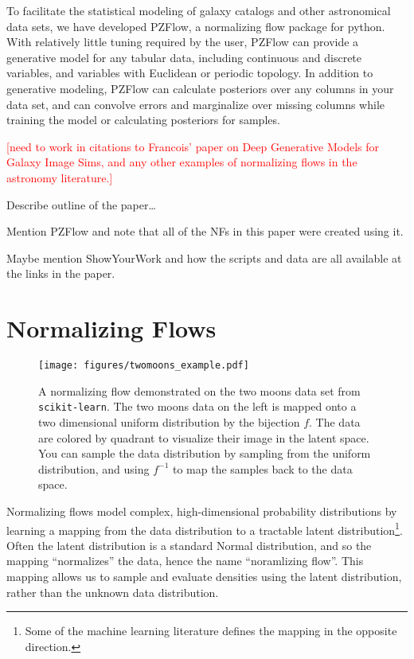 \documentclass[twocolumn]{aastex631}
\newcommand{\note}[1]{\textsf{\textcolor{red}{#1}}}
\begin{document}
To facilitate the statistical modeling of galaxy catalogs and other astronomical data sets, we have developed PZFlow, a normalizing flow package for python.
With relatively little tuning required by the user, PZFlow can provide a generative model for any tabular data, including continuous and discrete variables, and variables with Euclidean or periodic topology.
In addition to generative modeling, PZFlow can calculate posteriors over any columns in your data set, and can convolve errors and marginalize over missing columns while training the model or calculating posteriors for samples.

\note{[need to work in citations to Francois' paper on Deep Generative Models for Galaxy Image Sims, and any other examples of normalizing flows in the astronomy literature.]}

Describe outline of the paper\dots

Mention PZFlow and note that all of the NFs in this paper were created using it.

Maybe mention ShowYourWork and how the scripts and data are all available at the links in the paper.


\section{Normalizing Flows}
\label{sec:nf}

\begin{figure*}[t!]
    \begin{centering}
        \texttt{[image: figures/twomoons\_example.pdf]}
        \caption{
            A normalizing flow demonstrated on the two moons data set from \texttt{scikit-learn}.
            The two moons data on the left is mapped onto a two dimensional uniform distribution by the bijection $f$.
            The data are colored by quadrant to visualize their image in the latent space.
            You can sample the data distribution by sampling from the uniform distribution, and using $f^{-1}$ to map the samples back to the data space.
        }
        \label{fig:two-moons}
    \end{centering}
\end{figure*}

Normalizing flows model complex, high-dimensional probability distributions by learning a mapping from the data distribution to a tractable latent distribution\footnote{Some of the machine learning literature defines the mapping in the opposite direction.}.
Often the latent distribution is a standard Normal distribution, and so the mapping ``normalizes'' the data, hence the name ``noramlizing flow''.
This mapping allows us to sample and evaluate densities using the latent distribution, rather than the unknown data distribution.
\end{document}
